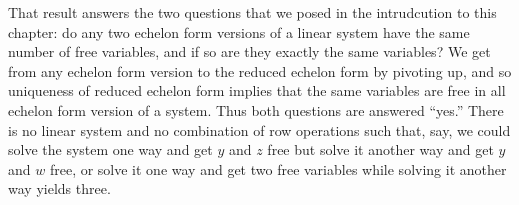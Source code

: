 That result answers the two questions that we posed in the intrudcution
to this chapter: do any two echelon form versions of a linear system 
have the same number of free variables, and if so are they
exactly the same variables?
We get from any echelon form version to the reduced echelon form by pivoting up,
and so uniqueness of reduced echelon form implies that the same variables 
are free in all echelon form version of a system.
Thus both questions are answered ``yes.''
There is no linear system and no combination of row operations such
that, say, we could solve the system 
one way and get $y$ and $z$ free but solve it
another way and get $y$ and $w$ free, or solve it one way and get two free
variables while solving it another way yields three. 







